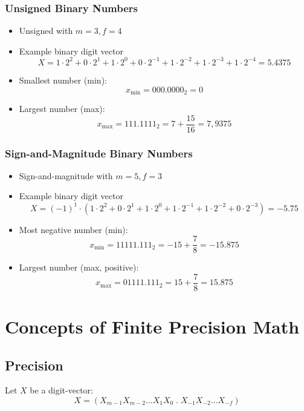 \documentclass[12pt,openany]{book}
\begin{document}
		\subsubsection{Unsigned Binary Numbers}
		
		\begin{itemize}
			\item[] Unsigned with \( m = 3, f = 4 \)
			\item[] Example binary digit vector
			      \[
			      	X = 1 \cdot 2^2 + 0 \cdot 2^1 + 1 \cdot 2^0 + 0 \cdot 2^{-1} + 1 \cdot 2^{-2} + 1 \cdot 2^{-3} + 1 \cdot 2^{-4} = 5.4375 \]
			      	
			      	\item[] Smallest number (min):
			      	\[
			      		x_{\text{min}} = 000.0000_2 = 0
			      	\]
			      	\item[] Largest number (max):
			      	\[
			      		x_{\text{max}} = 111.1111_2 = 7 + \frac{15}{16} = 7,9375
			      	\]
			      	\end{itemize}
			      	    
			      	\subsubsection{Sign-and-Magnitude Binary Numbers}
			      	\begin{itemize}
			      		\item[] Sign-and-magnitude with \( m = 5, f = 3 \)
			      		\item[] Example binary digit vector
			      		      \[
			      		      	X = (-1)^{1} \cdot (1 \cdot 2^2 + 0 \cdot 2^1 + 1 \cdot 2^0 + 1 \cdot 2^{-1} + 1 \cdot 2^{-2} + 0 \cdot 2^{-3}) = -5.75
			      		      \]
			      		\item[] Most negative number (min):
			      		      \[
			      		      	x_{\text{min}} = 1 1111.111_2 = -15 + \frac{7}{8} = -15.875
			      		      \]
			      		\item[] Largest number (max, positive):
			      		      \[
			      		      	x_{\text{max}} = 0 1111.111_2 = 15 + \frac{7}{8} = 15.875
			      		      \]
			      	\end{itemize}
			      	      
			      	\section{Concepts of
			      	Finite Precision Math}
			      	\subsection{Precision}
			      	Let \( X \) be a digit-vector:
			      	\[ X = (X_{m-1} X_{m-2} \dots X_1 X_0 \; . \;  X_{-1} X_{-2} \dots X_{-f}) \]
			      	
\end{document}
